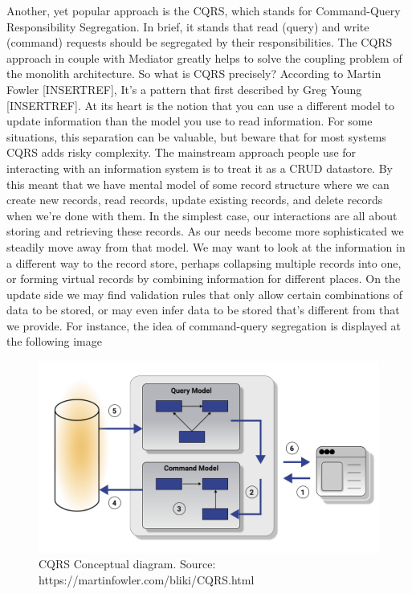 Another, yet popular approach is the CQRS, which stands for Command-Query Responsibility Segregation.
In brief, it stands that read (query) and write (command) requests should be segregated by their responsibilities.
The CQRS approach in couple with Mediator greatly helps to solve the coupling problem of the monolith architecture.
So what is CQRS precisely?
According to Martin Fowler [INSERTREF],
It's a pattern that first described by Greg Young [INSERTREF].
At its heart is the notion that you can use a different model to update information than the model you use to read information.
For some situations, this separation can be valuable, but beware that for most systems CQRS adds risky complexity.
The mainstream approach people use for interacting with an information system is to treat it as a CRUD datastore.
By this meant that we have mental model of some record structure where we can create new records, read records,
update existing records, and delete records when we're done with them.
In the simplest case, our interactions are all about storing and retrieving these records.
As our needs become more sophisticated we steadily move away from that model.
We may want to look at the information in a different way to the record store, perhaps collapsing multiple records into one,
or forming virtual records by combining information for different places.
On the update side we may find validation rules that only allow certain combinations of data to be stored, or may even infer
data to be stored that's different from that we provide.
For instance, the idea of command-query segregation is displayed at the following image

\begin{figure}[H]
    \centering
    \includegraphics[width=1\textwidth]{Pictures/cqrs.pdf}
    \caption{CQRS Conceptual diagram. Source: https://martinfowler.com/bliki/CQRS.html}\label{fig:figure}
\end{figure}

